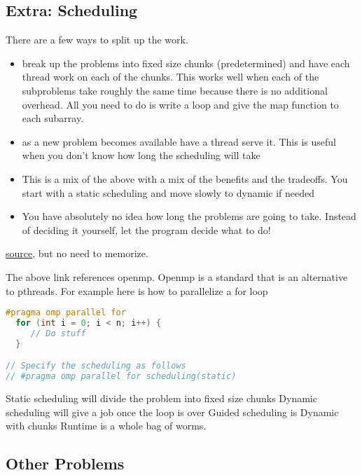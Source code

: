 \subsection{Extra: Scheduling}\label{scheduling}

There are a few ways to split up the work. 

\begin{itemize}
\item {} break up the problems into fixed size chunks (predetermined) and have each thread work on each of the chunks.
  This works well when each of the subproblems take roughly the same time because there is no additional overhead.
  All you need to do is write a loop and give the map function to each subarray.
\item {} as a new problem becomes available have a thread serve it.
  This is useful when you don't know how long the scheduling will take
\item {} This is a mix of the above with a mix of the benefits and the tradeoffs.
  You start with a static scheduling and move slowly to dynamic if needed
\item {} You have absolutely no idea how long the problems are going to take.
  Instead of deciding it yourself, let the program decide what to do!
\end{itemize}

\href{https://software.intel.com/en-us/articles/openmp-loop-scheduling}{source}, but no need to memorize.

The above link references openmp.
Openmp is a standard that is an alternative to pthreads.
For example here is how to parallelize a for loop

\begin{lstlisting}[language=C]
#pragma omp parallel for 
  for (int i = 0; i < n; i++) {
     // Do stuff
  }

// Specify the scheduling as follows
// #pragma omp parallel for scheduling(static)
\end{lstlisting}

Static scheduling will divide the problem into fixed size chunks
Dynamic scheduling will give a job once the loop is over
Guided scheduling is Dynamic with chunks
Runtime is a whole bag of worms.

\subsection{Other Problems}\label{other-problems}

